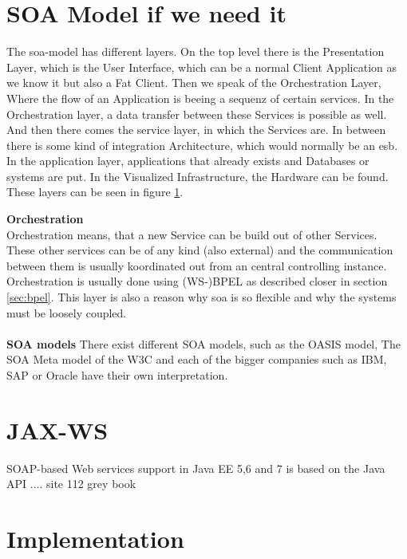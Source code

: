 \documentclass[12pt]{article}
\begin{document}
\section{SOA Model if we need it}
The \gls{soa}-model has different layers. On the top level there is the Presentation Layer, which is the User Interface, which can be a normal Client Application as we know it but also a Fat Client. Then we speak of the Orchestration Layer, Where the flow of an Application is beeing a sequenz of certain services. In the Orchestration layer, a data transfer between these Services is possible as well. And then there comes the service layer, in which the Services are. In between there is some kind of integration Architecture, which would normally be an \gls{esb}. In the application layer, applications that already exists and Databases or systems are put. In the Visualized Infrastructure, the Hardware can be found. These layers can be seen in figure \ref{fig:soamodelarch}.
\begin{figure}[here!]
	\centering
	\label{fig:soamodelarch}
	\end{figure}
	\FloatBarrier
\textbf{Orchestration}\\
Orchestration means, that a new Service can be build out of other Services. 
These other services can be of any kind (also external) and the communication between them is usually koordinated out from an central controlling instance. Orchestration is usually done using (WS-)BPEL as described closer in section \ref{sec:bpel}. This layer is also a reason why \gls{soa} is so flexible and why the systems must be loosely coupled. \cite[page 29]{soagoesreal}\\
\\
\textbf{SOA models}
There exist different SOA models, such as the OASIS model, The SOA Meta model of the W3C and each of the bigger companies such as IBM, SAP or Oracle have their own interpretation.

\section{JAX-WS}
SOAP-based Web services support in Java EE 5,6 and 7 is based on the Java API ....
site 112 grey book 

\newpage

\section{Implementation}
\end{document}
